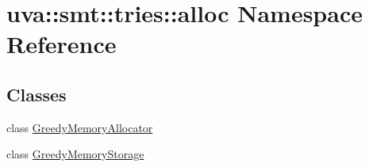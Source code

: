 \hypertarget{namespaceuva_1_1smt_1_1tries_1_1alloc}{}\section{uva\+:\+:smt\+:\+:tries\+:\+:alloc Namespace Reference}
\label{namespaceuva_1_1smt_1_1tries_1_1alloc}
\subsection*{Classes}
\begin{DoxyCompactItemize}
\item 
class \hyperlink{classuva_1_1smt_1_1tries_1_1alloc_1_1_greedy_memory_allocator}{Greedy\+Memory\+Allocator}
\item 
class \hyperlink{classuva_1_1smt_1_1tries_1_1alloc_1_1_greedy_memory_storage}{Greedy\+Memory\+Storage}
\end{DoxyCompactItemize}
